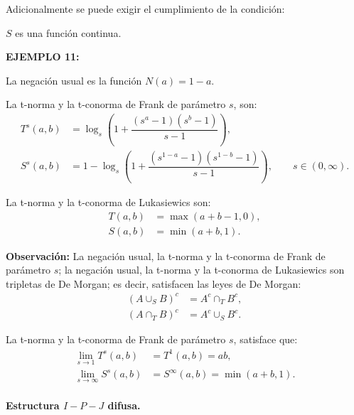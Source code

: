 \documentclass[a5paper,doc,10pt,noapacite]{apa6}
\begin{document}
{{Adicionalmente se puede exigir el cumplimiento de la condición:

\begin{center}
	\(S\) es una función continua.
\end{center}

\vspace{1\baselineskip}
\textbf{EJEMPLO 11:}

\begin{APAenumerate}
    \item La negación usual es la función \(N(a)=1-a\).
    \item La t-norma y la t-conorma de Frank de parámetro \(s\), son:
    \begin{align*}
    	T^s(a,b) & = \log _s \left(1+\dfrac{(s^a -1)(s^b-1)}{s-1}\right),			\\	
    	S^s(a,b) & = 1- \log _s \left(1+\dfrac{(s^{1-a} -1)(s^{1-b}-1)}{s-1}\right), 	\qquad s \in (0,\infty).
    \end{align*}

    \item La t-norma y la t-conorma de Lukasiewics son:
    \begin{align*}
    	T(a,b) & = \max (a+b-1,0),		\\
    	S(a,b) & = \min (a+b,1).
    \end{align*}    
    
\end{APAenumerate}

\textbf{Observación:} La negación usual, la t-norma y la t-conorma de Frank de parámetro \(s\); la negación usual, la t-norma y la t-conorma de Lukasiewics son tripletas de De Morgan; es decir, satisfacen las leyes de De Morgan:
\begin{align*}
	(A \cup_S B)^c &= A^c \cap_T B^c	,
	\\
	(A \cap_T B)^c &= A^c \cup_S B^c	.
\end{align*}

La t-norma y la t-conorma de Frank de parámetro \(s\), satisface que:
    \begin{align*}
    	\lim _{s \rightarrow 1} T^s(a,b) & = T^1(a,b)  = ab,	\\
    	\lim _{s \rightarrow \infty} S^s(a,b) & = S^{\infty} (a,b)  = \min (a+b,1).
    \end{align*}  

\paragraph{Estructura \(I-P-J\) difusa.}

}}
\end{document}
